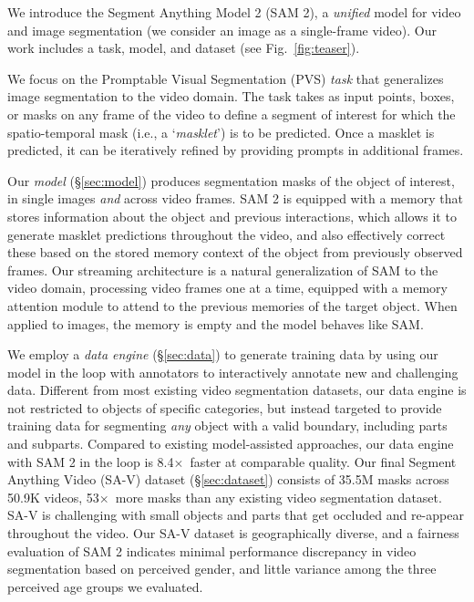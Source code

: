 \documentclass[]{fairmeta}
\newcommand{\x}{{\times}}
\def\x{$\times$}
\newcommand{\figref}[1]{Fig.~\ref{#1}}
\newcommand{\savinumvideos}{50.9K\xspace} %
\newcommand{\savinummasksWAuto}{35.5M\xspace}  %
\newcommand{\saviMoreMasksWAutoRate}{53\x\xspace}  %
\begin{document}
We introduce the Segment Anything Model 2 (SAM 2), a \textit{unified} model for video and image segmentation (we consider an image as a single-frame video). Our work includes a task, model, and dataset (see \figref{fig:teaser}). %

We focus on the Promptable Visual Segmentation (PVS) \textit{task} that generalizes image segmentation to the video domain. The task takes as input points, boxes, or masks on any frame of the video to define a segment of interest for which the spatio-temporal mask (i.e., a `\textit{masklet}') is to be predicted. Once a masklet is predicted, it can be iteratively refined by providing prompts in additional frames.

Our \textit{model} (\S\ref{sec:model}) produces segmentation masks of the object of interest, in single images \textit{and} across video frames. SAM 2 is equipped with a memory that stores information about the object and previous interactions, which allows it to generate masklet predictions throughout the video, and also effectively correct these based on the stored memory context of the object from previously observed frames. Our streaming architecture is a natural generalization of SAM to the video domain, processing video frames one at a time, equipped with a memory attention module to attend to the previous memories of the target object. When applied to images, the memory is empty and the model behaves like SAM. 

We employ a \textit{data engine} (\S\ref{sec:data}) to generate training data by using our model in the loop with annotators to interactively annotate new and challenging data. Different from most existing video segmentation datasets, our data engine is not restricted to objects of specific categories, but instead targeted to provide training data for segmenting \textit{any} object with a valid boundary, including parts and subparts. Compared to existing model-assisted approaches, our data engine with SAM 2 in the loop is {8.4\x}~faster at comparable quality. Our final Segment Anything Video (SA-V) dataset (\S\ref{sec:dataset}) consists of \savinummasksWAuto masks across \savinumvideos videos, %
{\saviMoreMasksWAutoRate}~more masks than any existing video segmentation dataset. SA-V is challenging with small objects and parts that get occluded and re-appear throughout the video. Our SA-V dataset is geographically diverse, and a fairness evaluation of SAM 2 indicates minimal performance discrepancy in video segmentation based on perceived gender, and little variance among the three perceived age groups we evaluated.
\end{document}
